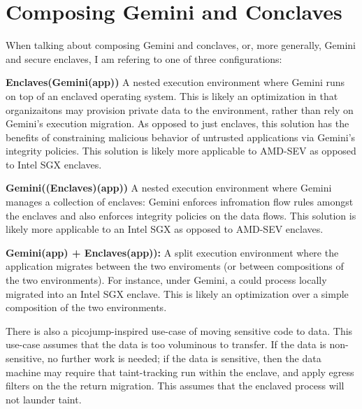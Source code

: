 \section{Composing Gemini and Conclaves}
\label{sec:composing}

When talking about composing Gemini and conclaves, or, more generally, Gemini
and secure enclaves, I am refering to one of three configurations:

\begin{widelist}
\item \textbf{Enclaves(Gemini(app))} 
    A nested execution environment where Gemini runs on top of an enclaved
    operating system.
    This is likely an optimization in that organizaitons may provision private
    data to the environment, rather than rely on Gemini's execution migration.  
    As opposed to just enclaves, this solution has the benefits of constraining
    malicious behavior of untrusted applications via Gemini's integrity
    policies.
    This solution is likely more applicable to AMD-SEV as opposed to Intel SGX
    enclaves.

\item \textbf{Gemini((Enclaves)(app))} 
    A nested execution environment where Gemini manages a collection of
    enclaves: Gemini enforces infromation flow rules amongst the enclaves and
    also enforces integrity policies on the data flows.
    This solution is likely more applicable to an Intel SGX as opposed to
    AMD-SEV enclaves.


\item \textbf{Gemini(app) + Enclaves(app)):}
    A split execution environment where the application migrates between the
    two enviroments (or between compositions of the two environments).
    For instance, under Gemini, a could process locally migrated into an Intel
    SGX enclave.
    This is likely an optimization over a simple composition of the two
    environments.
    

    There is also a picojump-inspired use-case of moving sensitive code to data.
    This use-case assumes that the data is too voluminous to transfer.
    If the data is non-sensitive, no further work is needed; if the data is
    sensitive, then the data machine may require that taint-tracking run within
    the enclave, and apply egress filters on the the return migration.
    This assumes that the enclaved process will not launder taint.
\end{widelist}
